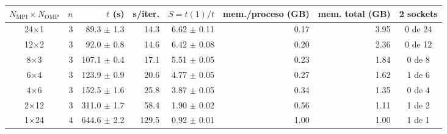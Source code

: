 \begin{tabular}{c r r r r r r c}
\toprule
$N_\mathrm{MPI}\times N_\mathrm{OMP}$ & $n$ & $t$ (s) & s/iter. & $S=t(1)/t$ & mem./proceso (GB) & mem. total (GB) & 2 sockets \\
\midrule
24$\times$1 & 3 & 89.3 $\pm$ 1.3 & 14.3 & 6.62 $\pm$ 0.11 & 0.17 & 3.95 & 0 de 24 \\
12$\times$2 & 3 & 92.0 $\pm$ 0.8 & 14.6 & 6.42 $\pm$ 0.08 & 0.20 & 2.36 & 0 de 12 \\
8$\times$3 & 3 & 107.1 $\pm$ 0.4 & 17.1 & 5.51 $\pm$ 0.05 & 0.23 & 1.84 & 0 de 8 \\
6$\times$4 & 3 & 123.9 $\pm$ 0.9 & 20.6 & 4.77 $\pm$ 0.05 & 0.27 & 1.62 & 1 de 6 \\
4$\times$6 & 3 & 152.5 $\pm$ 1.6 & 25.8 & 3.87 $\pm$ 0.05 & 0.34 & 1.35 & 0 de 4 \\
2$\times$12 & 3 & 311.0 $\pm$ 1.7 & 58.4 & 1.90 $\pm$ 0.02 & 0.56 & 1.11 & 1 de 2 \\
1$\times$24 & 4 & 644.6 $\pm$ 2.2 & 129.5 & 0.92 $\pm$ 0.01 & 1.00 & 1.00 & 1 de 1 \\
\bottomrule
\end{tabular}
